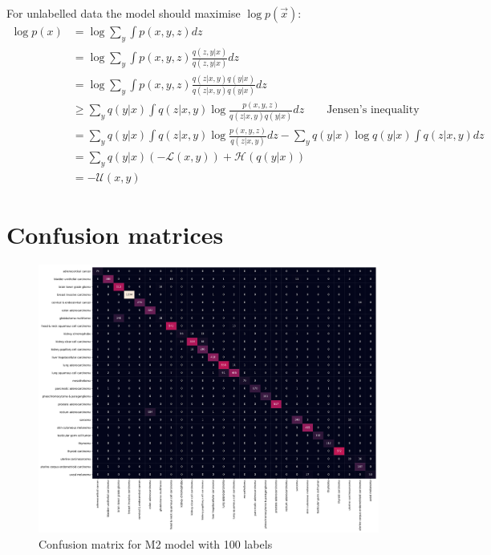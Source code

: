 For unlabelled data the model should maximise $\log p(\vec{x})$:
\begingroup
\allowdisplaybreaks
\begin{align*}
  \log p(x) & = \log \sum_{y} \int p(x, y, z) dz \\
  & = \log \sum_{y} \int p(x, y, z) \frac{q(z, y|x)}{q(z, y|x)} dz\\
  & = \log \sum_{y} \int p(x, y, z) \frac{q(z|x, y)q(y|x)}{q(z|x, y)q(y|x)} dz\\
  & \geq \sum_{y} q(y|x) \int q(z|x, y) \log\frac{p(x, y, z)}{q(z|x, y)q(y|x)} dz \qquad \text{Jensen's inequality}\\
  & = \sum_{y} q(y|x) \int q(z|x, y) \log\frac{p(x, y, z)}{q(z|x, y)} dz - \sum_{y} q(y|x) \log q(y|x) \int q(z|x, y) dz\\
  & = \sum_{y} q(y|x)(-\mathcal{L}(x, y)) + \mathcal{H}(q(y|x)) \\
  & = -\mathcal{U}(x, y)
\end{align*}
\endgroup

\chapter{Confusion matrices} \label{confusion}

\begin{figure}[H]
  \centering
  \includegraphics[scale=0.4, angle=90]{figs/m2_tcga_minmax_m2_100.pdf}
  \caption{Confusion matrix for M2 model with 100 labels}
\end{figure}

